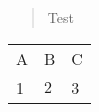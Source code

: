 \documentclass{article}
\begin{document}
\begin{abstract}
Test
\end{abstract}

\begin{table}
{\begin{tabular}{lll}
  A & B & C\\
  1 & $2$ & 3
 \end{tabular}
}
\end{table}
\end{document}
